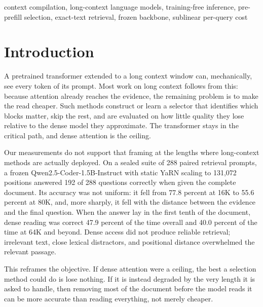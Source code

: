 \documentclass[conference]{IEEEtran}
\begin{document}
\begin{IEEEkeywords}
context compilation, long-context language models, training-free
inference, pre-prefill selection, exact-text retrieval, frozen
backbone, sublinear per-query cost
\end{IEEEkeywords}

\section{Introduction}

A pretrained transformer extended to a long context window can, mechanically, see
every token of its prompt. Most work on long context follows from this: because
attention already reaches the evidence, the remaining problem is to make the read
cheaper. Such methods construct or learn a selector that identifies which blocks
matter, skip the rest, and are evaluated on how little quality they lose relative to
the dense model they approximate. The transformer stays in the critical path, and
dense attention is the ceiling.

Our measurements do not support that framing at the lengths where long-context
methods are actually deployed. On a sealed suite of 288 paired retrieval prompts,
a frozen Qwen2.5-Coder-1.5B-Instruct with static YaRN scaling to 131,072
positions answered 192 of 288 questions correctly when given the complete
document. Its accuracy was not uniform: it fell from 77.8 percent at 16K to
55.6 percent at 80K, and, more sharply, it fell with the distance between the
evidence and the final question. When the answer lay in the first tenth of the
document, dense reading was correct 47.9 percent of the time overall and
40.0 percent of the time at 64K and beyond. Dense access did not produce reliable
retrieval; irrelevant text, close lexical distractors, and positional distance
overwhelmed the relevant passage.

This reframes the objective. If dense attention were a ceiling, the best a selection
method could do is lose nothing. If it is instead degraded by the very length it is
asked to handle, then removing most of the document before the model reads it can be
more accurate than reading everything, not merely cheaper.
\end{document}
